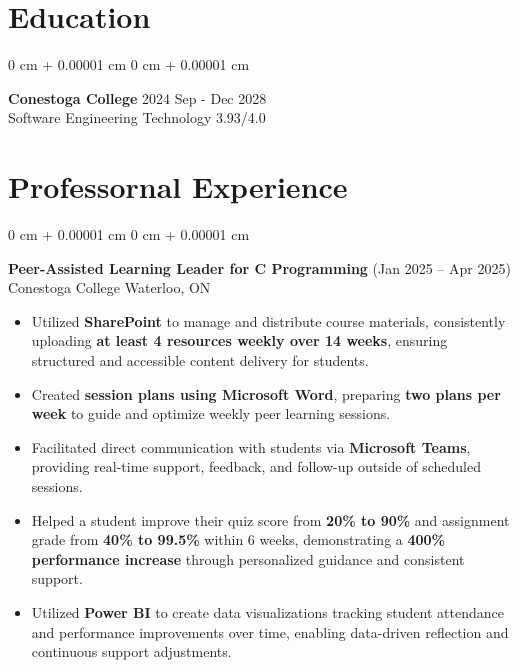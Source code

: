 \documentclass[10pt, letterpaper]{article}
\newenvironment{highlights}{
    \begin{itemize}[
        topsep=0.10 cm,
        parsep=0.10 cm,
        partopsep=0pt,
        itemsep=0pt,
        leftmargin=0 cm + 10pt
    ]
}{
    \end{itemize}
} %
\newenvironment{onecolentry}{
    \begin{adjustwidth}{
        0 cm + 0.00001 cm
    }{
        0 cm + 0.00001 cm
    }
}{
    \end{adjustwidth}
} %
\begin{document}
 \section{Education}
\vspace{-13pt}
\hrulefill
\vspace{+3pt}
\begin{onecolentry}
 {\normalsize \textbf{Conestoga College}} \hfill {2024 Sep - Dec 2028}\\
 \vspace{+3pt}
 {Software Engineering Technology} \hfill {3.93/4.0}\\
  \vspace{-8pt}
  
   
\end{onecolentry}
 
\section{Professornal Experience}
\vspace{-12pt}
\hrulefill
\begin{onecolentry}
    {\normalsize \textbf{Peer-Assisted Learning Leader for C Programming}} \hfill {(Jan 2025 – Apr 2025)}\\
    {Conestoga College} \hfill {Waterloo, ON}\\
    \begin{highlights}
        \item Utilized \textbf{SharePoint} to manage and distribute course materials, consistently uploading \textbf{at least 4 resources weekly over 14 weeks}, ensuring structured and accessible content delivery for students.
        \item Created  \textbf{session plans using Microsoft Word}, preparing \textbf{two plans per week} to guide and optimize weekly peer learning sessions.
        \item Facilitated direct communication with students via \textbf{Microsoft Teams}, providing real-time support, feedback, and follow-up outside of scheduled sessions.
        \item Helped a student improve their quiz score from \textbf{20\% to 90\%} and assignment grade from \textbf{40\% to 99.5\%} within 6 weeks, demonstrating a \textbf{400\% performance increase} through personalized guidance and consistent support.

        \item Utilized \textbf{Power BI} to create data visualizations tracking student attendance and performance improvements over time, enabling data-driven reflection and continuous support adjustments.

    \end{highlights}
\end{onecolentry}
\end{document}
